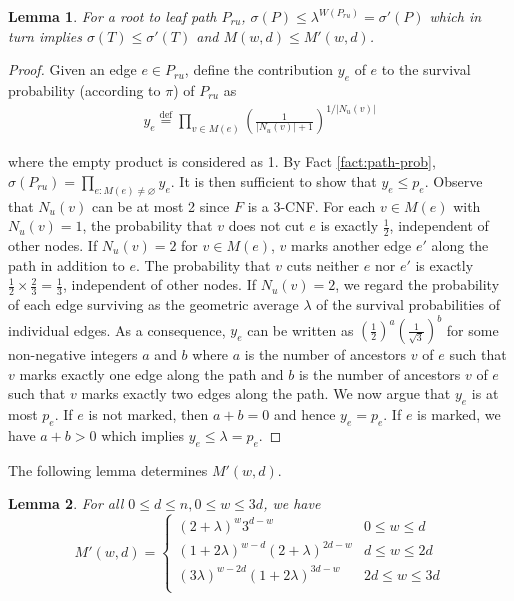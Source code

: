 \documentclass[10pt,a4paper]{article}
\let\emptyset\varnothing
\newcommand{\eqdef}{\stackrel{\textrm{def}}{=}}
\newtheorem{lemma}{Lemma}
\newcommand{\total}{\sigma}
\begin{document}
\begin{lemma}
\label{path-pessim}
For a root to leaf path $P_{ru}$, 
$\sigma(P) \le \lambda^{W(P_{ru})} = \sigma'(P)$ which in turn implies $\total(T)\leq \total'(T)$
and $M(w,d)\leq M'(w,d)$. 

\end{lemma}

\begin{proof}
Given an edge $e \in P_{ru}$, define the contribution $y_e$ of $e$ to the
	survival probability (according to $\pi$) of $P_{ru}$ as 
\begin{align*}
y_e \eqdef \prod_{v \in M(e)}\left(\frac{1}{|N_u(v)|+1}\right)^{1/|N_u(v)|}
\end{align*}

where the empty product is considered as 1.
By Fact \ref{fact:path-prob}, $\sigma(P_{ru}) = \prod_{e : M(e) \ne \emptyset} y_e$. It is then sufficient to show 
that $y_e \le p_e$. 
Observe that $N_u(v)$ can be at most 2 since $F$ is a $3$-CNF.
For each $v \in M(e)$ with $N_u(v) =1$, the probability that $v$ does not cut $e$
is exactly $\frac{1}{2}$, independent of other nodes.
If $N_u(v)=2$ for $v\in M(e)$, $v$ marks another edge 
$e'$ along the path in addition to $e$.
The probability that $v$ cuts neither $e$
nor $e'$ is exactly $\frac{1}{2}\times\frac{2}{3}=\frac{1}{3}$, independent of other nodes.
If $N_u(v)=2$, we regard the probability of each edge surviving 
as the geometric average $\lambda$ of the survival probabilities 
of individual edges.
As a consequence, $y_e$ can be written 
as $(\frac{1}{2})^a (\frac{1}{\sqrt{3}})^b$
for some non-negative integers $a$ and $b$ 
where $a$ is the number of ancestors $v$ of $e$ such 
that $v$ marks exactly one edge along the path
and $b$ is the number of ancestors $v$ of $e$ such 
that $v$ marks exactly two edges along the path.
We now argue that $y_e$ is at most $p_e$.
If $e$ is not marked, then $a+b=0$ and hence $y_e=p_e$.
If $e$ is marked, we have $a+b>0$ which implies $y_e\leq \lambda = p_e$.
\end{proof}

The following lemma determines $M'(w,d)$.

\begin{lemma} 
\label{thm:Mwd}
For all $0\le d\le n, 0\le w\le 3d$, we have
\[
M'(w,d) = 
\begin{cases}
(2+\lambda)^{w}3^{d-w} & 0\le w \le d\\
(1+2\lambda)^{w-d}(2+\lambda)^{2d-w} & d\le w\le 2d\\
(3\lambda)^{w-2d}(1+2\lambda)^{3d-w} & 2d\le w\le 3d\\
\end{cases}
\]
\end{lemma}
\end{document}
